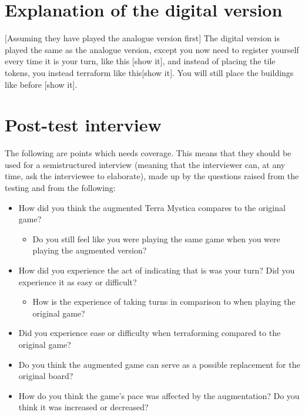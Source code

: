 \section{Explanation of the digital version}
[Assuming they have played the analogue version first]
The digital version is played the same as the analogue version, except you now need to register yourself every time it is your turn, like this [show it], and instead of placing the tile tokens, you instead terraform like this[show it]. You will still place the buildings like before [show it].

\section{Post-test interview}
The following are points which needs coverage. This means that they should be used for a semistructured interview (meaning that the interviewer can, at any time, ask the interviewee to elaborate), made up by the questions raised from the testing and from the following: 
\begin{itemize}
\item How did you think the augmented Terra Mystica compares to the original game?
\begin{itemize}
\item Do you still feel like you were playing the same game when you were playing the augmented version?
\end{itemize}
\item How did you experience the act of indicating that is was your turn? Did you experience it as easy or difficult?
\begin{itemize}
\item How is the experience of taking turns in comparison to when playing the original game?
\end{itemize}
\item Did you experience ease or difficulty when terraforming compared to the original game?
\item Do you think the augmented game can serve as a possible replacement for the original board?
\item How do you think the game's pace was affected by the augmentation? Do you think it was increased or decreased?
\end{itemize}


